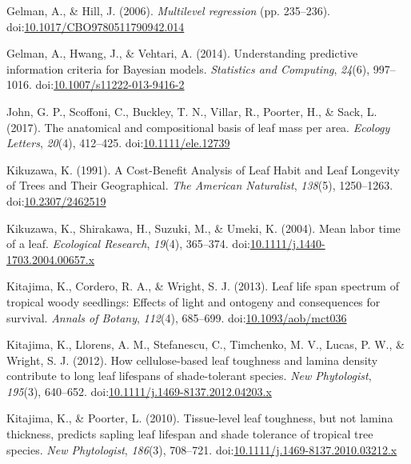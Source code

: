 \documentclass[12pt,]{article}
\theoremstyle{definition}
\theoremstyle{definition}
\theoremstyle{definition}
\theoremstyle{remark}
\begin{document}
\leavevmode\hypertarget{ref-Gelman2006}{}%
Gelman, A., \& Hill, J. (2006). \emph{Multilevel regression} (pp.
235--236).
doi:\href{https://doi.org/10.1017/CBO9780511790942.014}{10.1017/CBO9780511790942.014}

\leavevmode\hypertarget{ref-Gelman2014}{}%
Gelman, A., Hwang, J., \& Vehtari, A. (2014). Understanding predictive
information criteria for Bayesian models. \emph{Statistics and
Computing}, \emph{24}(6), 997--1016.
doi:\href{https://doi.org/10.1007/s11222-013-9416-2}{10.1007/s11222-013-9416-2}

\leavevmode\hypertarget{ref-John2017}{}%
John, G. P., Scoffoni, C., Buckley, T. N., Villar, R., Poorter, H., \&
Sack, L. (2017). The anatomical and compositional basis of leaf mass per
area. \emph{Ecology Letters}, \emph{20}(4), 412--425.
doi:\href{https://doi.org/10.1111/ele.12739}{10.1111/ele.12739}

\leavevmode\hypertarget{ref-Kikuzawa1991}{}%
Kikuzawa, K. (1991). A Cost-Benefit Analysis of Leaf Habit and Leaf
Longevity of Trees and Their Geographical. \emph{The American
Naturalist}, \emph{138}(5), 1250--1263.
doi:\href{https://doi.org/10.2307/2462519}{10.2307/2462519}

\leavevmode\hypertarget{ref-Kikuzawa2004}{}%
Kikuzawa, K., Shirakawa, H., Suzuki, M., \& Umeki, K. (2004). Mean labor
time of a leaf. \emph{Ecological Research}, \emph{19}(4), 365--374.
doi:\href{https://doi.org/10.1111/j.1440-1703.2004.00657.x}{10.1111/j.1440-1703.2004.00657.x}

\leavevmode\hypertarget{ref-Kitajima2013}{}%
Kitajima, K., Cordero, R. A., \& Wright, S. J. (2013). Leaf life span
spectrum of tropical woody seedlings: Effects of light and ontogeny and
consequences for survival. \emph{Annals of Botany}, \emph{112}(4),
685--699.
doi:\href{https://doi.org/10.1093/aob/mct036}{10.1093/aob/mct036}

\leavevmode\hypertarget{ref-Kitajima2012}{}%
Kitajima, K., Llorens, A. M., Stefanescu, C., Timchenko, M. V., Lucas,
P. W., \& Wright, S. J. (2012). How cellulose-based leaf toughness and
lamina density contribute to long leaf lifespans of shade-tolerant
species. \emph{New Phytologist}, \emph{195}(3), 640--652.
doi:\href{https://doi.org/10.1111/j.1469-8137.2012.04203.x}{10.1111/j.1469-8137.2012.04203.x}

\leavevmode\hypertarget{ref-Kitajima2010}{}%
Kitajima, K., \& Poorter, L. (2010). Tissue-level leaf toughness, but
not lamina thickness, predicts sapling leaf lifespan and shade tolerance
of tropical tree species. \emph{New Phytologist}, \emph{186}(3),
708--721.
doi:\href{https://doi.org/10.1111/j.1469-8137.2010.03212.x}{10.1111/j.1469-8137.2010.03212.x}
\end{document}
